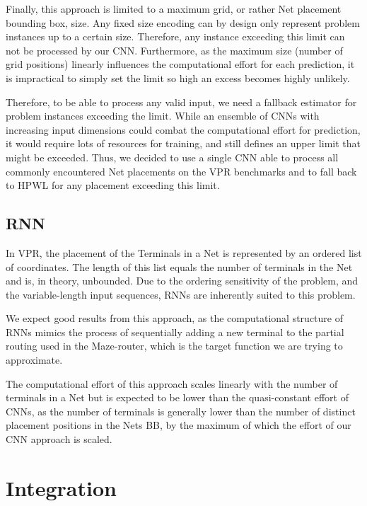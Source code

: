 Finally, this approach is limited to a maximum grid, or rather Net placement bounding box, size. Any fixed size encoding can by design only represent problem instances up to a certain size. Therefore, any instance exceeding this limit can not be processed by our \gls{CNN}. Furthermore, as the maximum size (number of grid positions) linearly influences the computational effort for each prediction, it is impractical to simply set the limit so high an excess becomes highly unlikely.

Therefore, to be able to process any valid input, we need a fallback estimator for problem instances exceeding the limit. While an ensemble of \glspl{CNN} with increasing input dimensions could combat the computational effort for prediction, it would require lots of resources for training, and still defines an upper limit that might be exceeded. Thus, we decided to use a single \gls{CNN} able to process all commonly encountered Net placements on the \gls{VPR} benchmarks and to fall back to \gls{HPWL} for any placement exceeding this limit.

\subsection{\gls{RNN}}

In \gls{VPR}, the placement of the Terminals in a Net is represented by an ordered list of coordinates. The length of this list equals the number of terminals in the Net and is, in theory, unbounded. Due to the ordering sensitivity of the problem, and the variable-length input sequences, \glspl{RNN} are inherently suited to this problem.

We expect good results from this approach, as the computational structure of \glspl{RNN} mimics the process of sequentially adding a new terminal to the partial routing used in the Maze-router, which is the target function we are trying to approximate.

The computational effort of this approach scales linearly with the number of terminals in a Net but is expected to be lower than the quasi-constant effort of \glspl{CNN}, as the number of terminals is generally lower than the number of distinct placement positions in the Nets \gls{BB}, by the maximum of which the effort of our CNN approach is scaled.

\section{Integration}

